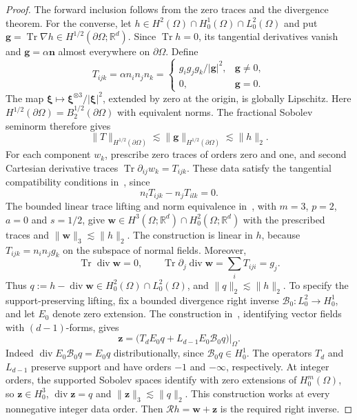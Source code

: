 \documentclass[10pt]{amsart}
\renewcommand{\div}{\operatorname{div}}
\numberwithin{equation}{section}
\begin{document}
\begin{proof}
The forward inclusion follows from the zero traces and the divergence theorem. For the converse, let $h\in H^2(\Omega)\cap H_0^1(\Omega)\cap L_0^2(\Omega)$ and put $\boldsymbol g=\operatorname{Tr}\nabla h\in H^{1/2}(\partial\Omega;\mathbb R^d)$. Since $\operatorname{Tr}h=0$, its tangential derivatives vanish and $\boldsymbol g=\alpha\boldsymbol n$ almost everywhere on $\partial\Omega$. Define
\[
T_{ijk}=\alpha n_i n_j n_k
=\begin{cases}
g_i g_j g_k/|\boldsymbol g|^2,&\boldsymbol g\ne0,\\
0,&\boldsymbol g=0.
\end{cases}
\]
The map $\boldsymbol\xi\mapsto\boldsymbol\xi^{\otimes3}/|\boldsymbol\xi|^2$, extended by zero at the origin, is globally Lipschitz. Here $H^{1/2}(\partial\Omega)=B_2^{1/2}(\partial\Omega)$ with equivalent norms. The fractional Sobolev seminorm therefore gives
\begin{equation}\label{eq:divlifting-trace-bound}
\|T\|_{H^{1/2}(\partial\Omega)}\lesssim\|\boldsymbol g\|_{H^{1/2}(\partial\Omega)}\lesssim\|h\|_2.
\end{equation}
For each component $w_k$, prescribe zero traces of orders zero and one, and second Cartesian derivative traces $\operatorname{Tr}\partial_{ij}w_k=T_{ijk}$. These data satisfy the tangential compatibility conditions in~\cite[Proposition~7.7]{MazyaMitreaShaposhnikova2010}, since
\[
n_lT_{ijk}-n_jT_{ilk}=0.
\]
The bounded linear trace lifting and norm equivalence in~\cite[Propositions~7.3, 7.6 and Theorem~7.8]{MazyaMitreaShaposhnikova2010}, with $m=3$, $p=2$, $a=0$ and $s=1/2$, give $\boldsymbol w\in H^3(\Omega;\mathbb R^d)\cap H_0^2(\Omega;\mathbb R^d)$ with the prescribed traces and $\|\boldsymbol w\|_3\lesssim\|h\|_2$. The construction is linear in $h$, because $T_{ijk}=n_i n_jg_k$ on the subspace of normal fields. Moreover,
\begin{equation}\label{eq:divlifting-matched-traces}
\operatorname{Tr}\div\boldsymbol w=0,\qquad
\operatorname{Tr}\partial_j\div\boldsymbol w=\sum_iT_{iji}=g_j.
\end{equation}
Thus $q:=h-\div\boldsymbol w\in H_0^2(\Omega)\cap L_0^2(\Omega)$, and $\|q\|_2\lesssim\|h\|_2$. To specify the support-preserving lifting, fix a bounded divergence right inverse $\mathcal B_0:L_0^2\to H_0^1$, and let $E_0$ denote zero extension. The construction in~\cite[Theorem~4.6 and proof of Corollary~4.7(b)]{CostabelMcIntosh2010}, identifying vector fields with $(d-1)$-forms, gives
\[
\boldsymbol z=\big(T_dE_0q+L_{d-1}E_0\mathcal B_0q\big)|_\Omega.
\]
Indeed $\div E_0\mathcal B_0q=E_0q$ distributionally, since $\mathcal B_0q\in H_0^1$. The operators $T_d$ and $L_{d-1}$ preserve support and have orders $-1$ and $-\infty$, respectively. At integer orders, the supported Sobolev spaces identify with zero extensions of $H_0^m(\Omega)$, so $\boldsymbol z\in H_0^3$, $\div\boldsymbol z=q$ and $\|\boldsymbol z\|_3\lesssim\|q\|_2$. This construction works at every nonnegative integer data order. Then $\mathcal Rh=\boldsymbol w+\boldsymbol z$ is the required right inverse.
\end{proof}
\end{document}
